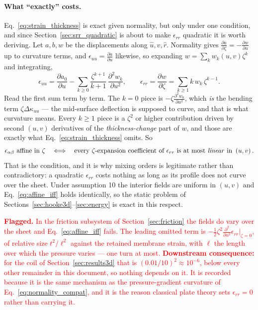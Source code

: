 \documentclass[11pt]{article}
\newcommand{\flagline}[1]{\par\medskip\noindent\textcolor{red}{\textbf{Flagged.}
  #1}\par\medskip}
\begin{document}
\paragraph{What ``exactly'' costs.} Eq.~\eqref{eq:strain_thickness} is exact
given normality, but only under one condition, and since
Section~\ref{sec:srr_quadratic} is about to make $\epsilon_{rr}$ quadratic it is
worth deriving. Let $a, b, w$ be the displacements along $\hat u, \hat v,
\hat r$. Normality gives $\frac{\partial a}{\partial \zeta}
= -\frac{\partial w}{\partial u}$ up to curvature terms, and
$\epsilon_{uu} = \frac{\partial a}{\partial u}$ likewise, so expanding
$w = \sum_k w_k\left(u,v\right)\zeta^{k}$ and integrating,
\begin{equation}\label{eq:affine_condition}
    \boxed{\;\epsilon_{uu} = \frac{\partial a_0}{\partial u}
      - \sum_{k\ge0}\frac{\zeta^{k+1}}{k+1}\,
        \frac{\partial^{2} w_k}{\partial u^{2}},
    \qquad
    \epsilon_{rr} = \frac{\partial w}{\partial \zeta}
      = \sum_{k\ge1} k\,w_k\,\zeta^{k-1}.\;}
\end{equation}
Read the first sum term by term. The $k = 0$ piece is
$-\zeta\frac{\partial^{2} w_0}{\partial u^{2}}$, which \emph{is} the bending term
$\zeta\Delta\kappa_{uu}$ --- the mid-surface deflection is supposed to curve, and
that is what curvature means. Every $k \ge 1$ piece is a $\zeta^{2}$ or higher
contribution driven by second $(u,v)$ derivatives of the \emph{thickness-change}
part of $w$, and those are exactly what Eq.~\eqref{eq:strain_thickness} omits.
So
\begin{equation}\label{eq:affine_iff}
    \epsilon_{\alpha\beta}\ \text{affine in }\zeta
    \quad\Longleftrightarrow\quad
    \text{every }\zeta\text{-expansion coefficient of }\epsilon_{rr}
    \text{ is at most \emph{linear} in }\left(u,v\right).
\end{equation}
That is the condition, and it is why mixing orders is legitimate rather than
contradictory: a quadratic $\epsilon_{rr}$ costs nothing as long as its profile
does not curve over the sheet. Under assumption 10 the interior fields are
uniform in $(u,v)$ and Eq.~\eqref{eq:affine_iff} holds identically, so the static
problem of Sections~\ref{sec:hooke3d}--\ref{sec:energy} is exact in this respect.

\flagline{In the friction subsystem of Section~\ref{sec:friction} the fields do
vary over the sheet and Eq.~\eqref{eq:affine_iff} fails. The leading omitted term
is $-\tfrac12\zeta^{2}\frac{\partial^{2}}{\partial u^{2}}
\left.\epsilon_{rr}\right|_{\zeta=0}$, of relative size $t^{2}/\ell^{2}$ against
the retained membrane strain, with $\ell$ the length over which the pressure
varies --- one turn at most. \textbf{Downstream consequence:} for the coil of
Section~\ref{sec:results3d} that is $\left(0.01/10\right)^{2} \approx 10^{-6}$,
below every other remainder in this document, so nothing depends on it. It is
recorded because it is the same mechanism as the pressure-gradient curvature of
Eq.~\eqref{eq:normality_compat}, and it is the reason classical plate theory sets
$\epsilon_{rr} = 0$ rather than carrying it.}
\end{document}
